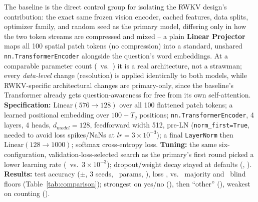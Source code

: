 \documentclass[final]{article}
\begin{document}
The baseline is the direct control group for isolating the RWKV design's contribution: the exact
same frozen vision encoder, cached features, data splits, optimizer family, and random seed as the
primary model, differing only in how the two token streams are compressed and mixed -- a plain
\textbf{Linear Projector} maps all 100 spatial patch tokens (no compression) into a standard,
unshared \texttt{nn.TransformerEncoder} alongside the question's word embeddings. At a comparable
parameter count (\baselineParams\ vs.\ \primaryParams) it is a real architecture, not a strawman;
every \emph{data-level} change (resolution) is applied identically to both models, while
RWKV-specific architectural changes are primary-only, since the baseline's Transformer already
gets question-awareness for free from its own self-attention. \textbf{Specification:}
$\mathrm{Linear}(576\to128)$ over all 100 flattened patch tokens; a learned positional embedding
over $100+T_q$ positions; \texttt{nn.TransformerEncoder}, 4 layers, 4 heads, $d_{model}=128$,
feedforward width 512, pre-LN (\texttt{norm\_first=True}, needed to avoid loss spikes/NaNs at
$lr=3\times10^{-3}$); a final \texttt{LayerNorm} then $\mathrm{Linear}(128\to1000)$; softmax
cross-entropy loss. \textbf{Tuning:} the same six-configuration, validation-loss-selected search
as the primary's first round picked a lower learning rate (\baselineTunedLR\ vs.\
$3\times10^{-3}$); dropout/weight decay stayed at defaults (\baselineTunedDropout,
\baselineTunedWeightDecay). \textbf{Results:} \textbf{\baselineTestAcc} test accuracy
($\pm$\baselineTestAccStd, 3 seeds, \baselineParams\ params, \baselineSize), loss
\baselineTestLoss, vs.\ \textbf{\majorityFloor} majority and \blindFloor\ blind floors
(Table~\ref{tab:comparison}); strongest on yes/no (\baselineAccYN), then ``other''
(\baselineAccOther), weakest on counting (\baselineAccNum).
\end{document}

